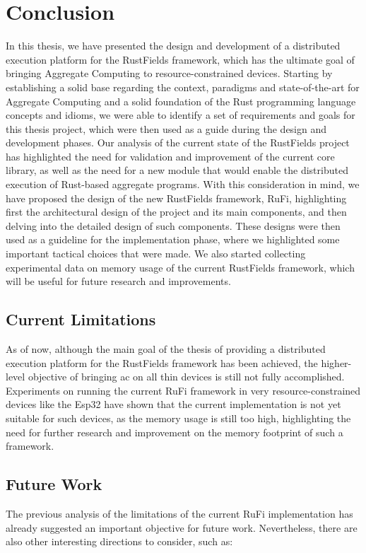 
\chapter{Conclusion}
\label{chap:conclusions}
In this thesis, we have presented the design and development of a distributed execution platform for the RustFields framework, which has the ultimate goal of bringing Aggregate Computing to resource-constrained devices.
Starting by establishing a solid base regarding the context, paradigms and state-of-the-art for Aggregate Computing and a solid foundation of the Rust programming language concepts and idioms,
we were able to identify a set of requirements and goals for this thesis project, which were then used as a guide during the design and development phases.
Our analysis of the current state of the RustFields project has highlighted the need for validation and improvement of the current core library, as well as the need for a new module that would enable
the distributed execution of Rust-based aggregate programs. With this consideration in mind, we have proposed the design of the new RustFields framework, RuFi, highlighting first the architectural design of the project and its main
components, and then delving into the detailed design of such components. These designs were then used as a guideline for the implementation phase, where we highlighted some important tactical choices that were made.
We also started collecting experimental data on memory usage of the current RustFields framework, which will be useful for future research and improvements.

\section{Current Limitations}
As of now, although the main goal of the thesis of providing a distributed execution platform for the RustFields framework has been achieved, the higher-level objective of bringing \ac{ac} on all thin devices is still not fully accomplished.
Experiments on running the current RuFi framework in very resource-constrained devices like the Esp32 have shown that the current implementation is not yet suitable for such devices, as the memory usage is still too high, highlighting the need
for further research and improvement on the memory footprint of such a framework.

\section{Future Work}
The previous analysis of the limitations of the current RuFi implementation has already suggested an important objective for future work.
Nevertheless, there are also other interesting directions to consider, such as:

